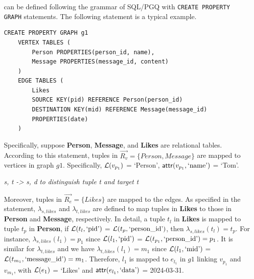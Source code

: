 \begin{example}
     can be defined following the grammar of SQL/PGQ with \lstinline{CREATE PROPERTY GRAPH} statements.
    The following statement is a typical example.
    \begin{lstlisting}
CREATE PROPERTY GRAPH g1
    VERTEX TABLES (
        Person PROPERTIES(person_id, name),
        Message PROPERTIES(message_id, content)
    )
    EDGE TABLES (
        Likes 
        SOURCE KEY(pid) REFERENCE Person(person_id) 
        DESTINATION KEY(mid) REFERENCE Message(message_id) 
        PROPERTIES(date)
    )
    \end{lstlisting}
    Specifically, suppose \textbf{Person}, \textbf{Message}, and \textbf{Likes} are relational tables.
    According to this statement, tuples in \(\vec{R_v} = \{Person, Message\}\) are mapped to vertices in graph $g1$.
    Specifically, \(\mathcal{L}(v_{p_1})\) = `Person', \({\mathsf{attr}}(v_{p_1}, \text{`name'})\) = `Tom'.

    \emph{s, t -> s, d to distinguish tuple t and target t}

    Moreover, tuples in \(\vec{R_e} = \{Likes\}\) are mapped to the edges.
    As specified in the statement, $\lambda_{s, likes}$ and $\lambda_{t, likes}$ are defined to map tuples in \textbf{Likes} to those in \textbf{Person} and \textbf{Message}, respectively.
    In detail, a tuple $t_l$ in \textbf{Likes} is mapped to tuple $t_p$ in \textbf{Person}, if \(\mathcal{L}(t_l, \text{`pid'})\) = \(\mathcal{L}(t_p, \text{`person\_id'})\), then \(\lambda_{s, likes}(t_l) = t_p\).
    For instance, $\lambda_{s, likes}(l_1) = p_1$ since \(\mathcal{L}(l_1, \text{`pid'})\) = \(\mathcal{L}(t_{p_1}, \text{`person\_id'}) = p_1\).
    It is similar for \(\lambda_{t, likes}\) and we have $\lambda_{t, likes}(l_1) = m_1$ since \(\mathcal{L}(l_1, \text{`mid'})\) = \(\mathcal{L}(t_{m_1}, \text{`message\_id'}) = m_1\).
    Therefore, $l_1$ is mapped to $e_{l_1}$ in $g1$ linking $v_{p_1}$ and $v_{m_1}$, with \(\mathcal{L}(e_1)\) = `Likes' and \({\mathsf{attr}}(e_{l_1}, \text{`data'})\) = 2024-03-31.

\end{example}


